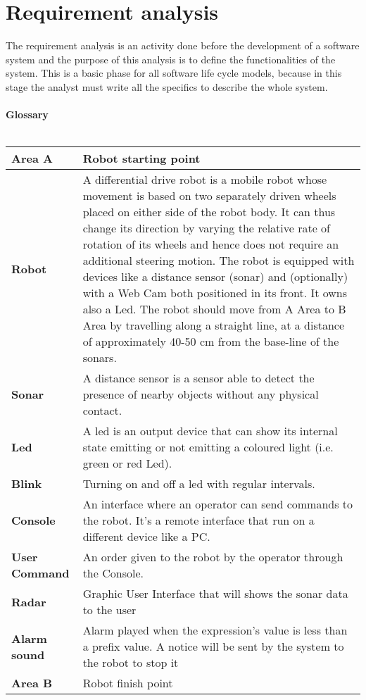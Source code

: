 \section{Requirement analysis}
The requirement analysis is an activity done before the development of a software system and the purpose of this analysis is to define the functionalities of the system. This is a basic phase for all software life cycle models, because in this stage the analyst must write all the specifics to describe the whole system. \\\\
\textbf{Glossary}\\\\
\begin{tabular}{| l | p{10cm} |}
\hline
\textbf{Area A} & Robot starting point \\ \hline
\textbf{Robot} & A differential drive robot is a mobile robot whose movement is based on two separately driven wheels placed on either side of the robot body. It can thus change its direction by varying the relative rate of rotation of its wheels and hence does not require an additional steering motion. The robot is equipped with devices like a distance sensor (sonar) and (optionally) with a Web Cam both positioned in its front. It owns also a Led. The robot should move from A Area to B Area by travelling along a straight line, at a distance of approximately 40-50 cm from the base-line of the sonars. \\ \hline
\textbf{Sonar} & A distance sensor is a sensor able to detect the presence of nearby objects without any physical contact. \\ \hline
\textbf{Led} & A led is an output device that can show its internal state emitting or not emitting a coloured light (i.e. green or red Led). \\ \hline
\textbf{Blink} & Turning on and off a led with regular intervals. \\ \hline
\textbf{Console} & An interface where an operator can send commands to the robot. It's a remote interface that run on a different device like a PC.\\ \hline
\textbf{User Command} & An order given to the robot by the operator through the Console. \\ \hline
\textbf{Radar} & Graphic User Interface that will shows the sonar data to the user \\ \hline
\textbf{Alarm sound} & Alarm played when the expression's value is less than a prefix value. A notice will be sent by the system to the robot to stop it\\ \hline
\textbf{Area B} & Robot finish point \\
\hline
\end{tabular}



